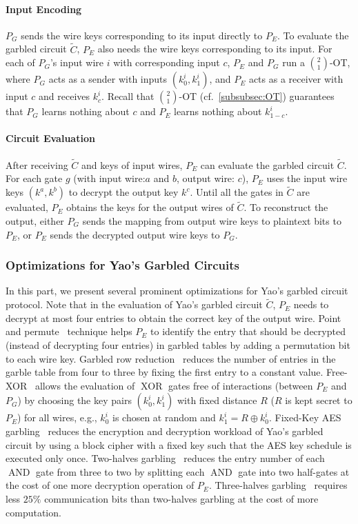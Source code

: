 \paragraph{Input Encoding}
$P_G$ sends the wire keys corresponding to its input directly to $P_E$. To evaluate the garbled circuit $\widetilde{C}$, $P_E$ also needs the wire keys corresponding to its input. For each of $P_G$'s input wire $i$ with corresponding input $c$, $P_E$ and $P_G$ run a $\binom{2}{1}$-OT, where $P_G$ acts as a sender with inputs $\left(k_0^i,k_1^i\right)$, and $P_E$ acts as a receiver with input $c$ and receives $k_c^i$. Recall that $\binom{2}{1}$-OT (cf.~\autoref{subsubsec:OT}) guarantees that $P_G$ learns nothing about $c$ and $P_E$ learns nothing about $k_{1-c}^i$.

\paragraph{Circuit Evaluation}
After receiving $\widetilde{C}$ and keys of input wires, $P_E$ can evaluate the garbled circuit $\widetilde{C}$. For each gate $g$ (with input wire:$a$ and $b$, output wire: $c$), $P_E$ uses the input wire keys $\left(k^a,k^b\right)$ to decrypt the output key $k^c$. Until all the gates in $\widetilde{C}$ are evaluated, $P_E$ obtains the keys for the output wires of $\widetilde{C}$. To reconstruct the output, either $P_G$ sends the mapping from output wire keys to plaintext bits to $P_E$, or $P_E$ sends the decrypted output wire keys to $P_G$.


\subsubsection{Optimizations for Yao's Garbled Circuits}
In this part, we present several prominent optimizations for Yao's garbled circuit protocol.
Note that in the evaluation of Yao's garbled circuit $\widetilde{C}$, $P_E$ needs to decrypt at most four entries to obtain the correct key of the output wire. Point and permute~\cite{beaver1990round} technique helps $P_E$ to identify the entry that should be decrypted (instead of decrypting four entries) in garbled tables by adding a permutation bit to each wire key.
Garbled row reduction~\cite{naor1999privacy} reduces the number of entries in the garble table from four to three by fixing the first entry to a constant value.
Free-XOR~\cite{kolesnikov2008improved} allows the evaluation of $\operatorname{XOR}$ gates free of interactions (between $P_E$ and $P_G$) by choosing the key pairs $\left(k_0^i,k_1^i\right)$ with fixed distance $R$ ($R$ is kept secret to $P_E$) for all wires, e.g., $k_0^i$ is chosen at random and $ k_1^i=R\oplus k_0^i $.
Fixed-Key AES garbling~\cite{bellare2013efficient} reduces the encryption and decryption workload of Yao's garbled circuit by using a block cipher with a fixed key such that the AES key schedule is executed only once.
Two-halves garbling~\cite{zahur2015two} reduces the entry number of each $\operatorname{AND}$ gate from three to two by splitting each $\operatorname{AND}$ gate into two half-gates at the cost of one more decryption operation of $P_E$.
Three-halves garbling~\cite{rosulek2021three} requires less $25\%$ communication bits than two-halves garbling at the cost of more computation.

